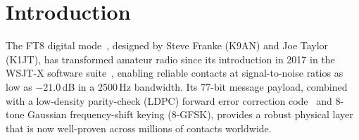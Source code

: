 %
%
%
%
%
%


\section{Introduction}
\label{sec:intro}

The FT8 digital mode~\cite{ft8}, designed by Steve Franke (K9AN) and Joe Taylor (K1JT), has transformed amateur radio since its
introduction in 2017 in the WSJT-X software suite~\cite{wsjtx}, enabling reliable contacts at signal-to-noise ratios
as low as $-21.0$\,dB in a 2500\,Hz bandwidth.  Its 77-bit message payload,
combined with a low-density parity-check (LDPC) forward error correction
code~\cite{gallager} and 8-tone Gaussian frequency-shift keying (8-GFSK), provides a
robust physical layer that is now well-proven across millions of contacts
worldwide.

